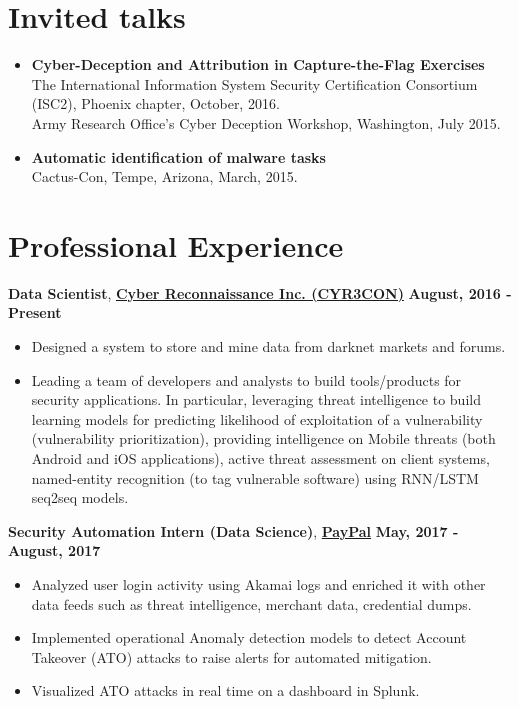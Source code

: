 \documentclass[margin,line]{CV}
\begin{document}
\begin{resume}
\begin{itemize}[leftmargin =*]
\end{itemize}

\section{\sc Invited talks}
\begin{itemize}[leftmargin =*]

\item {\bf Cyber-Deception and Attribution in Capture-the-Flag Exercises}\\
The International Information System Security Certification Consortium (ISC2), Phoenix chapter, October, 2016.\\
Army Research Office's Cyber Deception Workshop, Washington, July 2015.

\item {\bf Automatic identification of malware tasks}\\
Cactus-Con, Tempe, Arizona, March, 2015.
\end{itemize}


\section{\sc Professional Experience}

{\bf Data Scientist}, \href{http://www.cyr3con.com/}{\bf Cyber Reconnaissance Inc. (CYR3CON)}  \hfill {\bf August, 2016 - Present}
\begin{itemize}
	\item Designed a system to store and mine data from darknet markets and forums.
	\item Leading a team of developers and analysts to build tools/products for security applications. In particular, leveraging threat intelligence to build learning models for predicting likelihood of exploitation of a vulnerability (vulnerability prioritization), providing intelligence on Mobile threats (both Android and iOS applications), active threat assessment on client systems, named-entity recognition (to tag vulnerable software) using RNN/LSTM seq2seq models. 
	
\end{itemize}



{\bf Security Automation Intern (Data Science)}, \href{https://www.paypal.com/us/home}{\bf PayPal}  \hfill {\bf May, 2017 - August, 2017}
\begin{itemize}
    \item Analyzed user login activity using Akamai logs and enriched it with other data feeds such as threat intelligence, merchant data, credential dumps.
	\item Implemented operational Anomaly detection models to detect Account Takeover (ATO) attacks to raise alerts for automated mitigation.  
	\item Visualized ATO attacks in real time on a dashboard in Splunk.
	

\end{itemize}
\end{resume}
\end{document}
